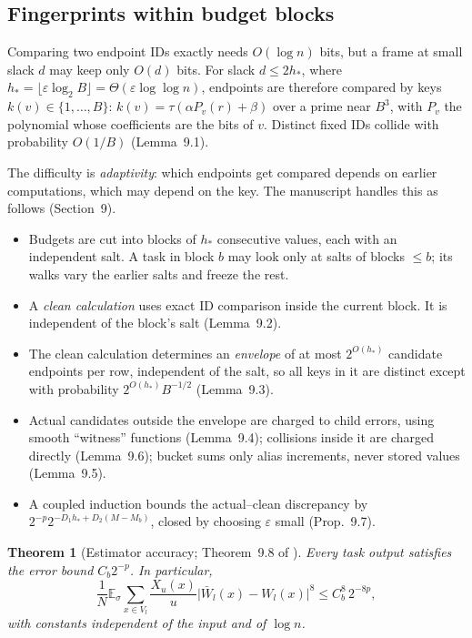 \documentclass[11pt]{article}
\newtheorem{theorem}{Theorem}[section]
\theoremstyle{definition}
\theoremstyle{remark}
\newcommand{\E}{\mathbb E}
\newcommand{\eps}{\varepsilon}
\newcommand{\abs}[1]{\lvert #1\rvert}
\begin{document}
\subsection{Fingerprints within budget blocks}\label{sec:fingerprints}

Comparing two endpoint IDs exactly needs $O(\log n)$ bits, but a frame at small
slack $d$ may keep only $O(d)$ bits. For slack $d\le2h_*$, where
$h_*=\lfloor\eps\log_2B\rfloor=\Theta(\eps\log\log n)$, endpoints are therefore compared by keys
$k(v)\in\{1,\dots,B\}$: $k(v)=\tau(\alpha P_v(r)+\beta)$ over a prime near $B^3$,
with $P_v$ the polynomial whose coefficients are the bits of $v$. Distinct fixed
IDs collide with probability $O(1/B)$ (Lemma~9.1).

The difficulty is \emph{adaptivity}: which endpoints get compared depends on
earlier computations, which may depend on the key. The manuscript handles this as
follows (Section~9).
\begin{itemize}
\item Budgets are cut into blocks of $h_*$ consecutive values, each with an
  independent salt. A task in block $b$ may look only at salts of blocks $\le b$;
  its walks vary the earlier salts and freeze the rest.
\item A \emph{clean calculation} uses exact ID comparison inside the current
  block. It is independent of the block's salt (Lemma~9.2).
\item The clean calculation determines an \emph{envelope} of at most $2^{O(h_*)}$
  candidate endpoints per row, independent of the salt, so all keys in it are
  distinct except with probability $2^{O(h_*)}B^{-1/2}$ (Lemma~9.3).
\item Actual candidates outside the envelope are charged to child errors, using
  smooth ``witness'' functions (Lemma~9.4); collisions inside it are charged
  directly (Lemma~9.6); bucket sums only alias increments, never stored values
  (Lemma~9.5).
\item A coupled induction bounds the actual--clean discrepancy by
  $2^{-p}2^{-D_1h_*+D_2(M-M_b)}$, closed by choosing $\eps$ small (Prop.~9.7).
\end{itemize}

\begin{theorem}[Estimator accuracy; Theorem~9.8 of \cite{OpenAI-BPL}]\label{thm:estimator}
Every task output satisfies the error bound $C_b2^{-p}$. In particular,
\[
\frac1N\E_\sigma\sum_{x\in V_l}\frac{X_u(x)}u\abs{\bar W_l(x)-W_l(x)}^8\le C_b^8\,2^{-8p},
\]
with constants independent of the input and of $\log n$.
\end{theorem}
\end{document}
